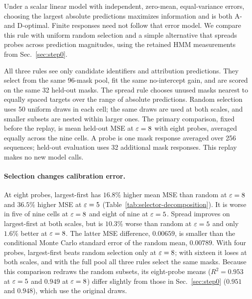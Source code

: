 Under a scalar linear model with independent, zero-mean, equal-variance errors,
choosing the largest
absolute predictions maximizes information and is both A- and D-optimal. Finite
responses need not follow that error model. We compare this rule with uniform
random selection and a simple alternative that spreads probes across prediction
magnitudes, using the retained HMM measurements from Sec.~\ref{sec:step0}.

All three rules see only candidate identifiers and attribution predictions.
They select from the same 96-mask pool, fit the same no-intercept gain, and are
scored on the same 32 held-out masks. The spread rule chooses unused masks nearest
to equally spaced targets over the range of absolute predictions. Random
selection uses 50 uniform draws in each cell; the same draws are used at both
scales, and smaller subsets are nested within larger ones. The primary comparison, fixed before the replay, is mean held-out MSE
at $\varepsilon=8$ with eight probes, averaged equally across the nine cells. A probe
is one mask response averaged over 256 sequences; held-out evaluation uses 32
additional mask responses. This replay makes no new model calls.

\paragraph{Selection changes calibration error.}
At eight probes, largest-first has $16.8\%$ higher mean MSE than random at
$\varepsilon=8$ and $36.5\%$ higher MSE at $\varepsilon=5$
(Table~\ref{tab:selector-decomposition}). It is worse in five of nine cells at
$\varepsilon=8$ and eight of nine at $\varepsilon=5$. Spread improves on largest-first at both
scales, but is $10.3\%$ worse than random at $\varepsilon=5$ and only $1.6\%$ better at
$\varepsilon=8$. The latter MSE difference, $0.00659$, is smaller than the conditional
Monte Carlo standard error of the random mean, $0.00789$.
With four probes, largest-first beats random selection only at $\varepsilon=8$;
with sixteen it loses at both scales, and with the full pool all three rules
select the same masks. Because this comparison redraws the random subsets,
its eight-probe means ($R^2=0.953$ at $\varepsilon=5$ and $0.949$ at $\varepsilon=8$)
differ slightly from those in Sec.~\ref{sec:step0} ($0.951$ and $0.948$),
which use the original draws.

